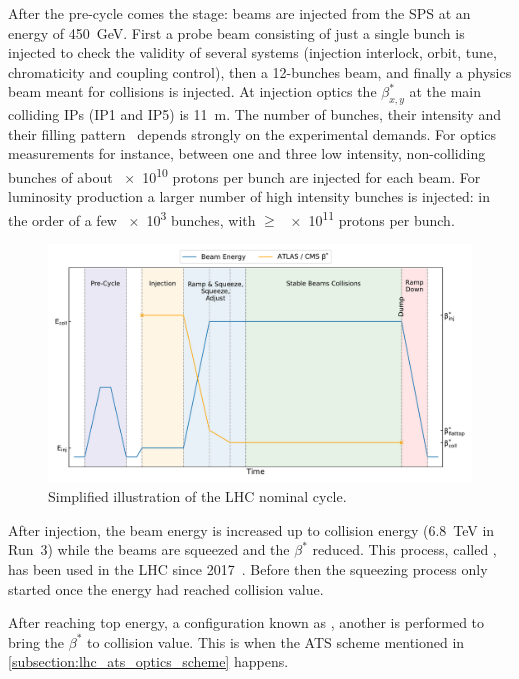 After the pre-cycle comes the  stage: beams are injected from the \gls{SPS} at an energy of \qty{450}{\giga\electronvolt}.
First a probe beam consisting of just a single bunch is injected to check the validity of several systems (injection interlock, orbit, tune, chromaticity and coupling control), then a \num{12}-bunches beam, and finally a physics beam meant for collisions is injected.
At injection optics the \(\beta^{\ast}_{x,y}\) at the main colliding \glspl{IP} (IP\num{1} and IP\num{5}) is \qty{11}{\metre}.
The number of bunches, their intensity and their filling pattern~\cite{Report:LHCStandardFillingSchemes} depends strongly on the experimental demands.
For \gls{optics} measurements for instance, between one and three low intensity, non-colliding bunches of about \num{e10} protons per bunch are injected for each beam.
For luminosity production a larger number of high intensity bunches is injected: in the order of a few \num{e3} bunches, with \(\ge\) \num{e11} protons per bunch.

\begin{figure}[!hbt]
  \centering
  \includegraphics*[width=\linewidth]{Figures/Optics_Measurements_Corrections_at_LHC/lhc_cycle.pdf}
  \caption{Simplified illustration of the LHC nominal cycle.}
  \label{figure:lhc_cycle}
\end{figure}

After injection, the beam energy is increased up to collision energy (\qty{6.8}{\tera\electronvolt} in Run~3) while the beams are squeezed and the \(\beta^{\ast}\) reduced.
This process, called , has been used in the LHC since 2017~\cite{IPAC:Camillocci:CombinedRampAndSqueeze}.
Before then the squeezing process only started once the energy had reached collision value.

After reaching top energy, a configuration known as , another  is performed to bring the \(\beta^{\ast}\) to collision value.
This is when the \acrshort{ATS} scheme mentioned in \cref{subsection:lhc_ats_optics_scheme} happens.

